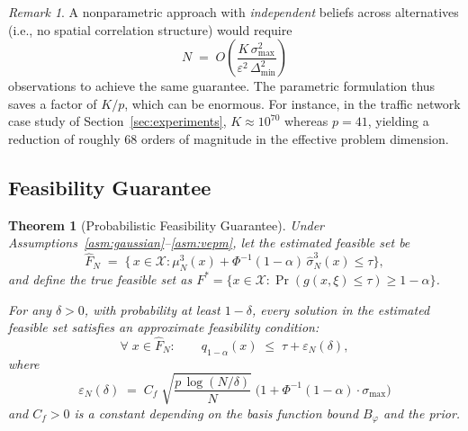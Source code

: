 \documentclass[12pt]{article}
\theoremstyle{plain}
\newtheorem{theorem}{Theorem}[section]
\theoremstyle{definition}
\theoremstyle{remark}
\newtheorem{remark}{Remark}[section]
\begin{document}
\begin{remark}\label{rem:parametric-saving}
A nonparametric approach with \emph{independent} beliefs across alternatives (i.e., no spatial correlation structure) would require
\[
  N \;=\; O\!\left(
    \frac{K\,\sigma_{\max}^{2}}
         {\varepsilon^{2}\,\Delta_{\min}^{2}}
  \right)
\]
observations to achieve the same guarantee.  The parametric formulation
thus saves a factor of $K/p$, which can be enormous.  For instance, in
the traffic network case study of Section~\ref{sec:experiments},
$K\approx10^{70}$ whereas $p=41$, yielding a reduction of roughly $68$
orders of magnitude in the effective problem dimension.
\end{remark}

\subsection{Feasibility Guarantee}\label{sec:feasibility}

\begin{theorem}[Probabilistic Feasibility Guarantee]\label{thm:feasibility}
Under Assumptions~\ref{asm:gaussian}--\ref{asm:vepm}, let the estimated
feasible set be
\[
  \hat{F}_{N} \;=\;
  \bigl\{\,x\in\mathcal{X} :
    \mu_{N}^{3}(x)+\Phi^{-1}(1-\alpha)\,\hat{\sigma}_{N}^{3}(x)
    \le \tau
  \bigr\},
\]
and define the true feasible set as
$F^{*}=\{x\in\mathcal{X}: \Pr(g(x,\xi)\le\tau)\ge1-\alpha\}$.

For any $\delta>0$, with probability at least $1-\delta$, every solution
in the estimated feasible set satisfies an approximate feasibility
condition:
\[
  \forall\; x\in\hat{F}_{N}:\qquad
  q_{1-\alpha}(x) \;\le\; \tau + \varepsilon_{N}(\delta),
\]
where
\[
  \varepsilon_{N}(\delta)
  \;=\;
  C_{f}\;\sqrt{\frac{p\,\log(N/\delta)}{N}}\;
  \bigl(1+\Phi^{-1}(1-\alpha)\cdot\sigma_{\max}\bigr)
\]
and $C_{f}>0$ is a constant depending on the basis function bound
$B_{\varphi}$ and the prior.
\end{theorem}
\end{document}
